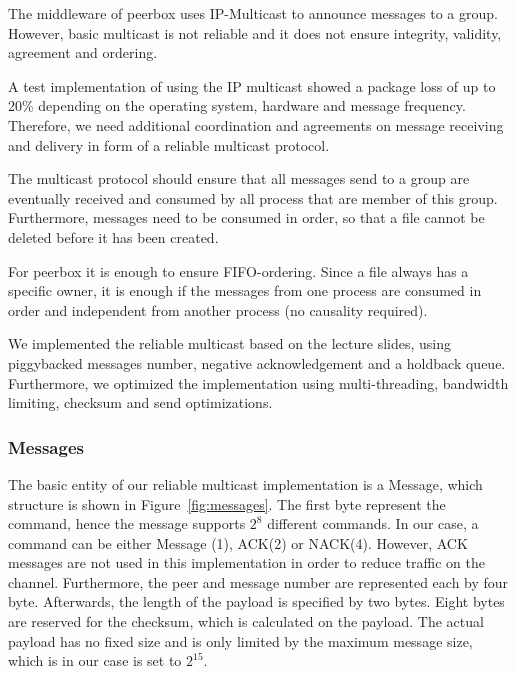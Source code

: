 The middleware of peerbox uses IP-Multicast to announce messages to a group. However, basic multicast is not reliable and it does not ensure integrity, validity, agreement and ordering.

A test implementation of using the IP multicast showed a package loss of up to 20\% depending on the operating system, hardware and message frequency. 
Therefore, we need additional coordination and agreements on message receiving and delivery in form of a reliable multicast protocol.


The multicast protocol should ensure that all messages send to a group are eventually received and consumed by all process that are member of this group. Furthermore, messages need to be consumed in order, so that a file cannot be deleted before it has been created. 

For peerbox it is enough to ensure FIFO-ordering. Since a file always has a specific owner, it is enough if the messages from one process are consumed in order and independent from another process (no causality required). 

We implemented the reliable multicast based on the lecture slides, using  piggybacked messages number, negative acknowledgement and a holdback queue. Furthermore, we optimized the implementation using  multi-threading, bandwidth limiting, checksum and send optimizations. 
    



 
% 
% 
% 
% 

\subsubsection{Messages}
The basic entity of our reliable multicast implementation is a Message, which structure is shown in Figure~\ref{fig:messages}. The first byte represent the command, hence the message supports $2^8$ different commands. In our case, a command can be either Message (1), ACK(2) or NACK(4). However, ACK messages are not used in this implementation in order to reduce traffic on the channel. Furthermore, the peer and message number are represented each by four byte. Afterwards, the length of the payload is specified by two bytes. Eight bytes are reserved for the checksum, which is calculated on the payload. The actual payload has no fixed size and is only limited by the maximum message size, which is in our case is set to $2^{15}$.

